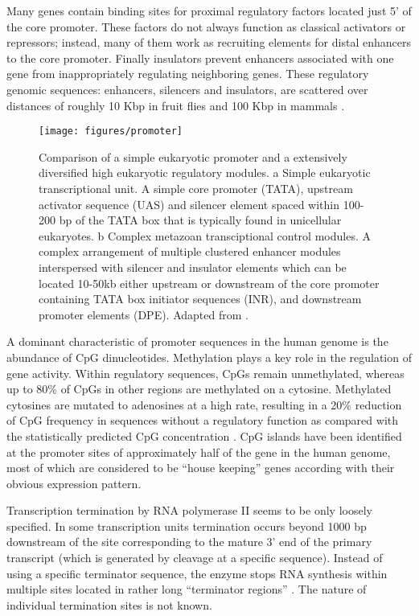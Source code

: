 Many genes contain binding sites for proximal regulatory factors
located just 5' of the core promoter. These factors do not always
function as classical activators or repressors; instead, many of them
work as recruiting elements for distal enhancers to the core
promoter. Finally insulators prevent enhancers associated with one
gene from inappropriately regulating neighboring genes. These
regulatory genomic sequences: enhancers, silencers and insulators, are
scattered over distances of roughly 10 Kbp in fruit flies and 100 Kbp
in mammals \citep{levine:2003a}.

\begin{figure}
\begin{center}
\texttt{[image: figures/promoter]}
\caption{Comparison of a simple eukaryotic promoter and a extensively 
diversified high eukaryotic regulatory modules. a Simple eukaryotic
transcriptional unit. A simple core promoter (TATA), upstream
activator sequence (UAS) and silencer element spaced within 100-200 bp
of the TATA box that is typically found in unicellular eukaryotes. b
Complex metazoan transciptional control modules. A complex arrangement
of multiple clustered enhancer modules interspersed with silencer and
insulator elements which can be located 10-50kb either upstream or
downstream of the core promoter containing TATA box initiator
sequences (INR), and downstream promoter elements (DPE). Adapted from
\citep{levine:2003a}.}
\label{transcription}
\end{center}
\end{figure}



A dominant characteristic of promoter sequences in the human genome is
the abundance of CpG dinucleotides. Methylation plays a key role in
the regulation of gene activity. Within regulatory sequences, CpGs
remain unmethylated, whereas up to 80\% of CpGs in other regions are
methylated on a cytosine. Methylated cytosines are mutated to
adenosines at a high rate, resulting in a 20\% reduction of CpG
frequency in sequences without a regulatory function as compared with
the statistically predicted CpG concentration \citep{fazzari:2004a}.
CpG islands have been identified at the promoter sites of
approximately half of the gene in the human genome, most of which are
considered to be ``house keeping'' genes according with their obvious
expression pattern.


Transcription termination by RNA polymerase II seems to be only
loosely specified. In some transcription units termination occurs
beyond 1000 bp downstream of the site corresponding to the mature 3'
end of the primary transcript (which is generated by cleavage at a
specific sequence). Instead of using a specific terminator sequence,
the enzyme stops RNA synthesis within multiple sites located in rather
long ``terminator regions'' \citep{lewis:1997a}. The nature of
individual termination sites is not known.


